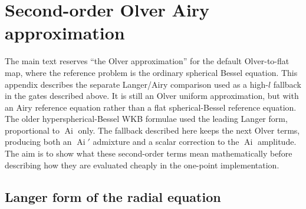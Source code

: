 \documentclass[11pt,a4paper]{article}
\newcommand{\Ai}{\operatorname{Ai}}
\begin{document}
\appendix

\section{Second-order Olver Airy approximation}
\label{app:second-order-airy}

The main text reserves ``the Olver approximation'' for the default
Olver-to-flat map, where the reference problem is the ordinary spherical
Bessel equation.  This appendix describes the separate Langer/Airy comparison
used as a high-\(l\) fallback in the gates described above.  It is still an
Olver uniform approximation, but with an Airy reference equation rather than a
flat spherical-Bessel reference equation.  The older hyperspherical-Bessel WKB
formulae used the leading Langer form, proportional to \(\Ai\) only.  The
fallback described here keeps the next Olver terms, producing both an \(\Ai'\)
admixture and a scalar correction to the \(\Ai\) amplitude.  The aim is to show
what these second-order terms mean mathematically before describing how they
are evaluated cheaply in the one-point implementation.

\subsection{Langer form of the radial equation}
\end{document}
